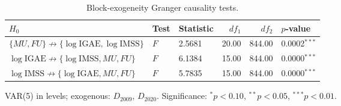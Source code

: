 \begin{table}[ht]
\centering
\begin{threeparttable}
\caption{Block-exogeneity Granger causality tests.} 
\label{tab:granger}
\begin{tabular}{lllrrl}
  \toprule
$H_0$ & Test & Statistic & $df_1$ & $df_2$ & $p$-value \\ 
  \midrule
$\{MU,FU\} \not\rightarrow \{\log\text{IGAE},\log\text{IMSS}\}$ & $F$ & 2.5681 & 20.00 & 844.00 & 0.0002$^{***}$ \\ 
  $\log\text{IGAE} \not\rightarrow \{\log\text{IMSS}, MU, FU\}$ & $F$ & 6.1384 & 15.00 & 844.00 & 0.0000$^{***}$ \\ 
  $\log\text{IMSS} \not\rightarrow \{\log\text{IGAE}, MU, FU\}$ & $F$ & 5.7835 & 15.00 & 844.00 & 0.0000$^{***}$ \\ 
   \bottomrule
\end{tabular}
\begin{tablenotes}
\small
\item VAR(5) in levels; exogenous: $D_{2009}$, $D_{2020}$. Significance: $^{*}p<0.10$, $^{**}p<0.05$, $^{***}p<0.01$.
\end{tablenotes}
\end{threeparttable}
\end{table}
